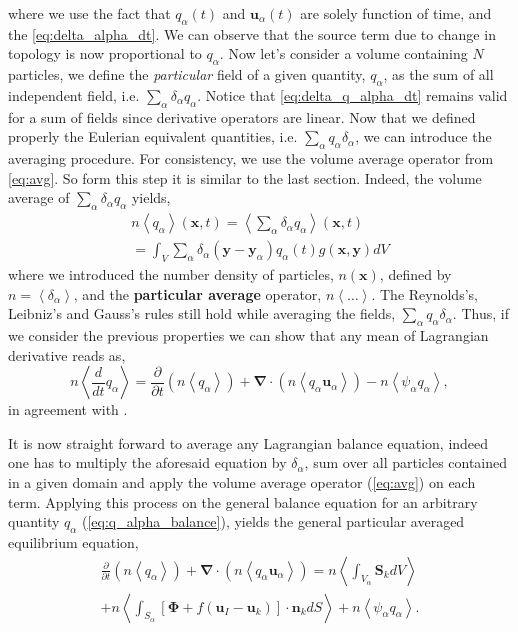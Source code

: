 \documentclass[twocolumn]{My_article}
\newcommand{\avg}[1]{\left<#1\right>}
\newcommand{\pavg}[1]{n \left<#1\right>}
\newcommand{\nablab}{\bm{\nabla}}
\newcommand{\ddt}{\frac{d}{d t}}
\newcommand{\pddt}{\frac{\partial}{\partial t}}
\begin{document}
where we use the fact that $q_\alpha(t)$ and $\textbf{u}_\alpha(t)$ are solely function of time, and the \ref{eq:delta_alpha_dt}.
We can observe that the source term due to change in topology is now proportional to $q_\alpha$.
Now let's consider a volume containing $N$ particles, we define the \textit{particular} field of a given quantity, $q_\alpha$, as the sum of all independent field, i.e. $\sum_\alpha \delta_\alpha q_\alpha$.
Notice that \ref{eq:delta_q_alpha_dt} remains valid for a sum of fields since derivative operators are linear.
Now that we defined properly the Eulerian equivalent quantities, i.e. $\sum_\alpha q_\alpha \delta_\alpha$, we can introduce the averaging procedure.
For consistency, we use the volume average operator from \ref{eq:avg}.
So form this step it is similar to the last section.
Indeed, the volume average of $\sum_\alpha \delta_\alpha q_\alpha$ yields,
\begin{multline}
    \pavg{q_\alpha}(\textbf{x},t)
    = \avg{\sum_\alpha\delta_\alpha q_\alpha} (\textbf{x},t)\\
    = \int_V
    \sum_\alpha \delta_\alpha(\textbf{y}- \textbf{y}_\alpha) q_\alpha(t)
    g(\textbf{x},\textbf{y})
    dV
    \label{eq:avg_p}
\end{multline}
where we introduced the number density of particles, $n(\textbf{x})$, defined by $n = \avg{\delta_\alpha}$, and the \textbf{particular average} operator, $\pavg{\ldots}$.
The Reynolds’s, Leibniz's and Gauss's rules still hold while averaging the fields, $\sum_\alpha q_\alpha \delta_\alpha$.
Thus, if we consider the previous properties we can show that any mean of Lagrangian derivative reads as,
\begin{equation}
    \pavg{\ddt q_\alpha}
    = \pddt \left(\pavg{q_\alpha}\right)
    + \nablab \cdot \left(\pavg{q_\alpha \textbf{u}_\alpha}\right)
    - \pavg{\psi_\alpha q_\alpha}
    ,\label{eq:q_alpha_dt_avg}
\end{equation}
in agreement with \citep{anderson1967fluid}.

It is now straight forward to average any Lagrangian balance equation, indeed one has to multiply the aforesaid equation by $\delta_\alpha$, sum over all particles contained in a given domain and apply the volume average operator (\ref{eq:avg}) on each term.
Applying this process on the general balance equation for an arbitrary quantity $q_\alpha$ (\ref{eq:q_alpha_balance}), yields the general particular averaged equilibrium equation,
\begin{multline}
    \pddt   \left(\pavg{q_\alpha}\right)
    + \nablab \cdot \left(\pavg{q_\alpha \textbf{u}_\alpha}\right)
    = \pavg{\int_{V_\alpha} \textbf{S}_k dV}\\
    + \pavg{\int_{S_\alpha} \left[\bm{\Phi} + f (\textbf{u}_I-\textbf{u}_k) \right] \cdot \textbf{n}_k d S}
    + \pavg{\psi_\alpha q_\alpha}
    .\label{eq:q_avg_p_global}
\end{multline}
\end{document}

